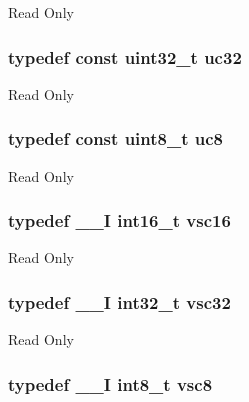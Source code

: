 Read Only \hypertarget{group___exported__types_ga5b628e6a05856ff67e535fa391a57683}{
\subsubsection[{uc32}]{\setlength{\rightskip}{0pt plus 5cm}typedef const uint32\-\_\-t {\bf uc32}}}\label{group___exported__types_ga5b628e6a05856ff67e535fa391a57683}
Read Only \hypertarget{group___exported__types_gac74022c74a461f810e0d4fdc9bfea480}{
\subsubsection[{uc8}]{\setlength{\rightskip}{0pt plus 5cm}typedef const uint8\-\_\-t {\bf uc8}}}\label{group___exported__types_gac74022c74a461f810e0d4fdc9bfea480}
Read Only \hypertarget{group___exported__types_ga369ae0177b957e5afa7c1e62312f97c3}{
\subsubsection[{vsc16}]{\setlength{\rightskip}{0pt plus 5cm}typedef {\bf \-\_\-\-\_\-\-I} int16\-\_\-t {\bf vsc16}}}\label{group___exported__types_ga369ae0177b957e5afa7c1e62312f97c3}
Read Only \hypertarget{group___exported__types_gaec1d22666cf030b79051e5daa372fbc8}{
\subsubsection[{vsc32}]{\setlength{\rightskip}{0pt plus 5cm}typedef {\bf \-\_\-\-\_\-\-I} int32\-\_\-t {\bf vsc32}}}\label{group___exported__types_gaec1d22666cf030b79051e5daa372fbc8}
Read Only \hypertarget{group___exported__types_ga47463bcded079ac61d5da46aff497803}{
\subsubsection[{vsc8}]{\setlength{\rightskip}{0pt plus 5cm}typedef {\bf \-\_\-\-\_\-\-I} int8\-\_\-t {\bf vsc8}}}\label{group___exported__types_ga47463bcded079ac61d5da46aff497803}
